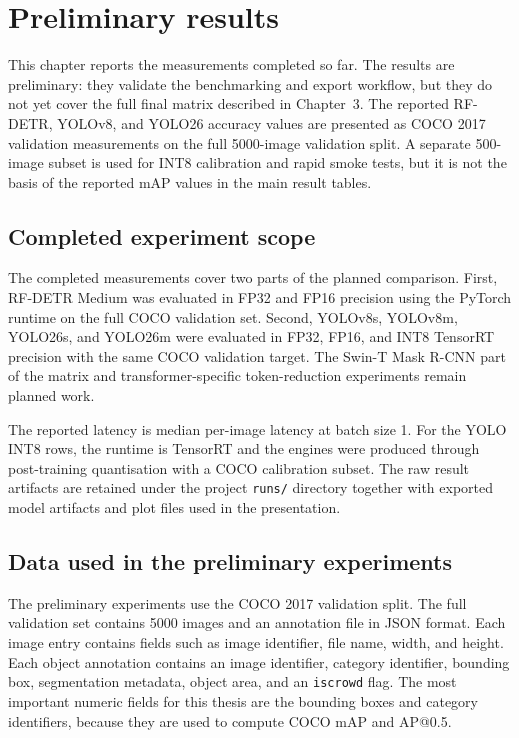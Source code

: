 \documentclass[a4paper,11pt,twoside]{report}
\theoremstyle{definition}
\begin{document}
\chapter{Preliminary results}

This chapter reports the measurements completed so far. The results are preliminary: they validate the benchmarking and export workflow, but they do not yet cover the full final matrix described in Chapter~3. The reported RF-DETR, YOLOv8, and YOLO26 accuracy values are presented as COCO 2017 validation measurements on the full 5000-image validation split. A separate 500-image subset is used for INT8 calibration and rapid smoke tests, but it is not the basis of the reported mAP values in the main result tables.

\section{Completed experiment scope}

The completed measurements cover two parts of the planned comparison. First, RF-DETR Medium was evaluated in FP32 and FP16 precision using the PyTorch runtime on the full COCO validation set. Second, YOLOv8s, YOLOv8m, YOLO26s, and YOLO26m were evaluated in FP32, FP16, and INT8 TensorRT precision with the same COCO validation target. The Swin-T Mask R-CNN part of the matrix and transformer-specific token-reduction experiments remain planned work.

The reported latency is median per-image latency at batch size 1. For the YOLO INT8 rows, the runtime is TensorRT and the engines were produced through post-training quantisation with a COCO calibration subset. The raw result artifacts are retained under the project \texttt{runs/} directory together with exported model artifacts and plot files used in the presentation.

\section{Data used in the preliminary experiments}

The preliminary experiments use the COCO 2017 validation split. The full validation set contains 5000 images and an annotation file in JSON format. Each image entry contains fields such as image identifier, file name, width, and height. Each object annotation contains an image identifier, category identifier, bounding box, segmentation metadata, object area, and an \texttt{iscrowd} flag. The most important numeric fields for this thesis are the bounding boxes and category identifiers, because they are used to compute COCO mAP and AP@0.5.
\end{document}
